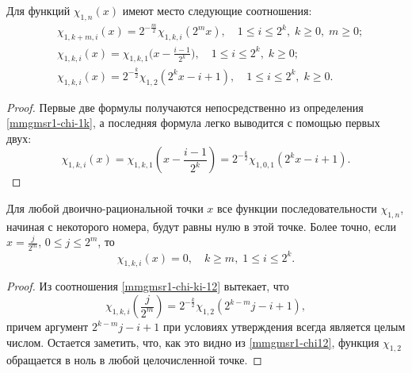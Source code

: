 \begin{statement}
	Для функций $\chi_{1,n}(x)$ имеют место следующие соотношения:
	\begin{align}
	\label{mmgmsr1-chi-k-m}
	&\chi_{1,k+m,i}(x)=2^{-\frac{m}{2}}\chi_{1,k,i}(2^m x), \quad 1 \le i \le 2^k, \; k \ge 0, \; m \ge 0;\\
	\label{mmgmsr1-chi-i-1}
	&\chi_{1,k,i}(x)=\chi_{1,k,1}\bigl(x - \frac{i-1}{2^k}\bigr), \quad 1 \le i \le 2^k, \; k \ge 0;\\
	\label{mmgmsr1-chi-ki-12}
	&\chi_{1,k,i}(x)=2^{-\frac{k}{2}}\chi_{1,2}(2^kx-i+1), \quad 1 \le i \le 2^k, \; k \ge 0.
	\end{align}
\end{statement}
\begin{proof}
	Первые две формулы получаются непосредственно из определения \eqref{mmgmsr1-chi-1k}, а последняя формула легко выводится с помощью первых двух:
	\begin{equation*}
	\chi_{1,k,i}(x)=\chi_{1,k,1}(x - \frac{i-1}{2^k})=2^{-\frac{k}{2}}\chi_{1,0,1}(2^kx-i+1).
	\end{equation*}
\end{proof}

\begin{statement}\label{mmgmsr1-st-zero-for-bin}
	Для любой двоично-рациональной точки $x$ все функции последовательности $\chi_{1,n}$, начиная с некоторого номера, будут равны нулю в этой точке. Более точно, если $x=\frac{j}{2^m}$, $0 \le j \le 2^m$, то
	\begin{equation*}
	\chi_{1,k,i}(x)=0, \quad k \ge m, \; 1 \le i \le 2^k.
	\end{equation*}
\end{statement}
\begin{proof}
	Из соотношения \eqref{mmgmsr1-chi-ki-12} вытекает, что
	\begin{equation*}
	\chi_{1,k,i}(\frac{j}{2^m})=2^{-\frac{k}{2}}\chi_{1,2}(2^{k-m}j-i+1),
	\end{equation*}
	причем аргумент $2^{k-m}j-i+1$ при условиях утверждения всегда является целым числом. Остается заметить, что, как это видно из \eqref{mmgmsr1-chi12}, функция $\chi_{1,2}$ обращается в ноль в любой целочисленной точке.
\end{proof}

